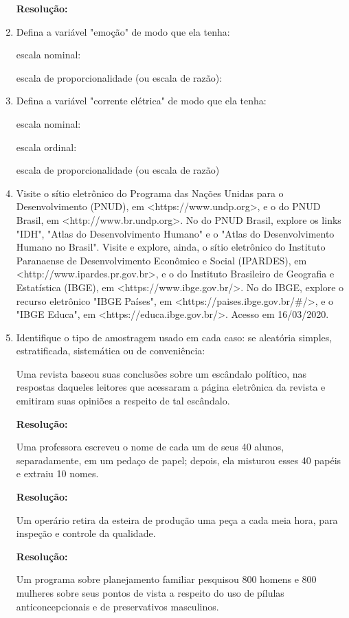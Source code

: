 \begin{enumerate}
	\textbf{Resolução:}
	
	\item Defina a variável "emoção" de modo que ela tenha:
	
	\subitem escala nominal: 
	
	\subitem escala de proporcionalidade (ou escala de razão):
	
	\item Defina a variável "corrente elétrica" de modo que ela tenha:
	
	\subitem escala nominal:
	
	\subitem escala ordinal:
	
	\subitem escala de proporcionalidade (ou escala de razão)
	
	\item Visite o sítio eletrônico do Programa das Nações Unidas para o Desenvolvimento
(PNUD),
em
<https://www.undp.org>,
e
o
do
PNUD
Brasil,
em
<http://www.br.undp.org>. No do PNUD Brasil, explore os links "IDH", "Atlas do
Desenvolvimento Humano" e o "Atlas do Desenvolvimento Humano no Brasil". Visite e
explore, ainda, o sítio eletrônico do Instituto Paranaense de Desenvolvimento
Econômico e Social (IPARDES), em <http://www.ipardes.pr.gov.br>, e o do Instituto
Brasileiro de Geografia e Estatística (IBGE), em <https://www.ibge.gov.br/>. No do
IBGE, explore o recurso eletrônico "IBGE Países", em <https://paises.ibge.gov.br/\#/>,
e o "IBGE Educa", em <https://educa.ibge.gov.br/>. Acesso em 16/03/2020.
	
	\item Identifique o tipo de amostragem usado em cada caso: se aleatória simples,
estratificada, sistemática ou de conveniência:
	
	\subitem Uma revista baseou suas conclusões sobre um escândalo político, nas respostas
	daqueles leitores que acessaram a página eletrônica da revista e emitiram suas
	opiniões a respeito de tal escândalo. 
	
	\textbf{Resolução:}~
	
	\subitem Uma professora escreveu o nome de cada um de seus 40 alunos, separadamente,
em um pedaço de papel; depois, ela misturou esses 40 papéis e extraiu 10 nomes.
	
	\textbf{Resolução:}~
	
	\subitem Um operário retira da esteira de produção uma peça a cada meia hora, para inspeção
e controle da qualidade. 
	
	\textbf{Resolução:}~
	
	\subitem Um programa sobre planejamento familiar pesquisou 800 homens e 800 mulheres
sobre seus pontos de vista a respeito do uso de pílulas anticoncepcionais e de
preservativos masculinos.
	

\end{enumerate}
